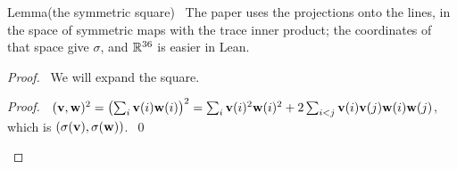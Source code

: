 \begin{namedresult}{Lemma}{(the symmetric square)}\label{lem:4-symsq}
 \uses{}
 \new\ The paper uses the projections onto the lines, in the space of symmetric maps with the
 trace inner product; the coordinates of that space give $\sigma$, and ${\mathbb R}^{36}$ is easier in
 Lean.
\end{namedresult}
\begin{proof}
 \pfsketch\ We will expand the square.
 \qedstep
 \begin{proof}\pf\ $({\mathbf v},{\mathbf w})^2=\bigl(\sum_i{\mathbf v}(i){\mathbf w}(i)\bigr)^2=\sum_i{\mathbf v}(i)^2{\mathbf w}(i)^2+2\sum_{i<j}{\mathbf v}(i){\mathbf v}(j){\mathbf w}(i){\mathbf w}(j)$, which
  is $(\sigma({\mathbf v}),\sigma({\mathbf w}))$.~\qed\end{proof}
\end{proof}

